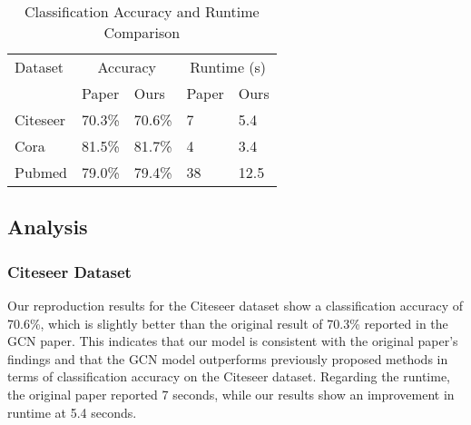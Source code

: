 \documentclass[11pt,a4paper]{article}
\begin{document}
\begin{table}[ht]
  \centering
  \caption{Classification Accuracy and Runtime Comparison}
  \label{tab:accuracy_runtime_comparison}
  \begin{tabularx}{\columnwidth}{lXXXX}
  \hline
  Dataset & \multicolumn{2}{c}{Accuracy} & \multicolumn{2}{c}{Runtime (s)} \\ \cline{2-3} \cline{4-5}
          & Paper & Ours & Paper & Ours \\ \hline
  Citeseer & 70.3\% & 70.6\% & 7 & 5.4 \\
  Cora     & 81.5\% & 81.7\% & 4 & 3.4 \\
  Pubmed   & 79.0\% & 79.4\% & 38 & 12.5 \\ \hline
  \end{tabularx}
\end{table}





\subsection{Analysis}

\subsubsection{Citeseer Dataset}

Our reproduction results for the Citeseer dataset show a classification accuracy of 70.6\%, which is slightly better than the original result of 70.3\% reported in the GCN paper. This indicates that our model is consistent with the original paper's findings and that the GCN model outperforms previously proposed methods in terms of classification accuracy on the Citeseer dataset. Regarding the runtime, the original paper reported 7 seconds, while our results show an improvement in runtime at 5.4 seconds.
\end{document}
